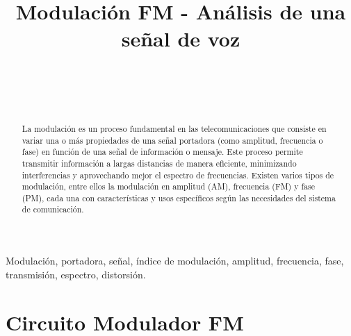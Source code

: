 \documentclass[conference]{IEEEtran}
\begin{document}
	
	\title{Modulación FM - Análisis de una señal de voz}
	\author{
		\\
		\\
		\\
		\and
		\and
		\and
	}
	
	\maketitle
	\begin{abstract}
		La modulación es un proceso fundamental en las telecomunicaciones que consiste en variar una o más propiedades de una señal portadora (como amplitud, frecuencia o fase) en función de una señal de información o mensaje. Este proceso permite transmitir información a largas distancias de manera eficiente, minimizando interferencias y aprovechando mejor el espectro de frecuencias. Existen varios tipos de modulación, entre ellos la modulación en amplitud (AM), frecuencia (FM) y fase (PM), cada una con características y usos específicos según las necesidades del sistema de comunicación.
		
	\end{abstract}
	
	\begin{IEEEkeywords}
		Modulación, portadora, señal, índice de modulación, amplitud, frecuencia, fase, transmisión, espectro, distorsión.
	\end{IEEEkeywords}
	
	\section{Circuito Modulador FM}
	
\end{document}
